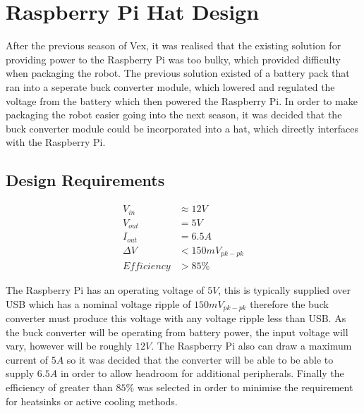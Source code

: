 \newpage


\section{Raspberry Pi Hat Design}
After the previous season of Vex, it was realised that the existing solution for providing power to the Raspberry Pi was too bulky, which provided difficulty when packaging the robot. The previous solution existed of a battery pack that ran into a seperate buck converter module, which lowered and regulated the voltage from the battery which then powered the Raspberry Pi. In order to make packaging the robot easier going into the next season, it was decided that the buck converter module could be incorporated into a hat, which directly interfaces with the Raspberry Pi.

\subsection{Design Requirements}

\begin{align}
    V_{in} &\approx 12V \\
    V_{out} &= 5V \\
    I_{out} &= 6.5A \\
    \Delta V &< 150mV_{pk-pk} \\
    Efficiency &> 85\%
\end{align}

The Raspberry Pi has an operating voltage of $5V$, this is typically supplied over USB which has a nominal voltage ripple of $150mV_{pk-pk}$ therefore the buck converter must produce this voltage with any voltage ripple less than USB. As the buck converter will be operating from battery power, the input voltage will vary, however will be roughly $12V$. The Raspberry Pi also can draw a maximum current of $5A$ so it was decided that the converter will be able to be able to supply $6.5A$ in order to allow headroom for additional peripherals. Finally the efficiency of greater than $85\%$ was selected in order to minimise the requirement for heatsinks or active cooling methods.